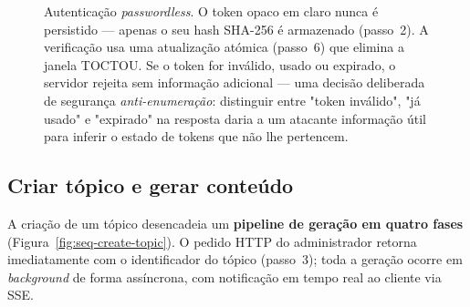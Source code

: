 \begin{figure}[H]
	\caption[Sequ\^encia de autentica\c{c}\~ao por \emph{magic link}]{Autentica\c{c}\~ao \emph{passwordless}. O token opaco em claro nunca \'e persistido --- apenas o seu hash SHA-256 \'e armazenado (passo~2). A verifica\c{c}\~ao usa uma atualiza\c{c}\~ao at\'omica (passo~6) que elimina a janela TOCTOU. Se o token for inv\'alido, usado ou expirado, o servidor rejeita sem informa\c{c}\~ao adicional --- uma decis\~ao deliberada de seguran\c{c}a \emph{anti-enumera\c{c}\~ao}: distinguir entre "token inv\'alido", "j\'a usado" e "expirado" na resposta daria a um atacante informa\c{c}\~ao \'util para inferir o estado de tokens que n\~ao lhe pertencem.}
	\label{fig:seq-auth}
\end{figure}

\subsection{Criar t\'opico e gerar conte\'udo}
\label{ssec:seq-create-topic}

A cria\c{c}\~ao de um t\'opico desencadeia um \textbf{pipeline de gera\c{c}\~ao
em quatro fases} (Figura~\ref{fig:seq-create-topic}). O pedido HTTP do
administrador retorna imediatamente com o identificador do t\'opico (passo~3);
toda a gera\c{c}\~ao ocorre em \emph{background} de forma ass\'incrona, com
notifica\c{c}\~ao em tempo real ao cliente via SSE.

